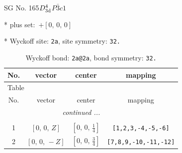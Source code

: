 \documentclass[fleqn,8pt]{jsarticle}
\begin{document}
\setcounter{MaxMatrixCols}{32}

\renewcommand{\tablename}{Table~}
\renewcommand{\figurename}{Figure~}
\begin{center}
\LARGE
SG No. 165\quad$D_{\rm 3d}^{4}$\quad$P\bar{3}c1$\quad[ trigonal ]
\end{center}

* plus set:\,\,\,$+\left[ 0,\, 0,\, 0 \right]$


* Wyckoff site: {\tt 2a}, site symmetry: {\tt 32.}
\renewcommand{\arraystretch}{1.2}
\begin{longtable}{cccc}
\caption{Wyckoff bond: {\tt 2a@2a}, bond symmetry: {\tt 32.}}
 \\
 \hline \hline
No. & vector & center & mapping \\ \hline \endfirsthead

\multicolumn{3}{l}{\tablename\ \thetable{}} \\
 \hline \hline
No. & vector & center & mapping \\ \hline \endhead

 \hline \hline
\multicolumn{3}{r}{\footnotesize\it continued ...} \\ \endfoot

 \hline \hline
\multicolumn{3}{r}{} \\ \endlastfoot

1 & $\left[ 0,\, 0,\, Z \right]$ & $\left[ 0,\, 0,\, \frac{1}{4} \right]$ & {\tt [1,2,3,-4,-5,-6]} \\ \hline
2 & $\left[ 0,\, 0,\, - Z \right]$ & $\left[ 0,\, 0,\, \frac{3}{4} \right]$ & {\tt [7,8,9,-10,-11,-12]} \\
\end{longtable}
\renewcommand{\arraystretch}{1.2}
\end{document}

